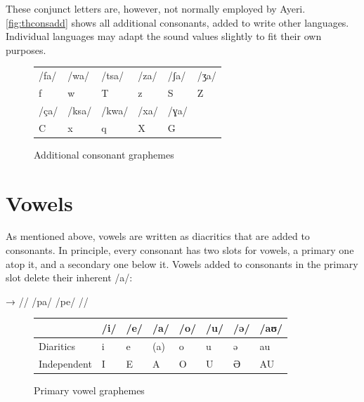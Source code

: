 \noindent These conjunct letters are, however, not normally employed by Ayeri. 
\autoref{fig:thconsadd} shows all additional consonants, added to write other 
languages. Individual languages may adapt the sound values slightly to fit 
their 
own purposes.

\begin{figure}[ht]
\caption{Additional consonant graphemes}

\begin{tabu} to \linewidth{X[c] X[c] X[c] X[c] X[c] X[c]}
\toprule
\tableheaderfont	/fa/ & /wa/ & /tsa/ & /za/ & /ʃa/ & /ʒa/ \\
\rowfont{\Tagati\huge}	f & w & T & z & S & Z \\

\midrule

\tableheaderfont	/ça/ & /ksa/ & /kwa/ & /xa/ & /ɣa/ \\
\rowfont{\Tagati\huge}	C & x & q & X & G \\

\bottomrule
\end{tabu}
\label{fig:thconsadd}
\end{figure}


\section{Vowels}

As mentioned above, vowels are written as diacritics that are added to 
consonants. In principle, every consonant has two slots for vowels, a primary 
one atop it, and a secondary one below it. Vowels added to consonants in 
the primary slot delete their inherent /a/:

\ex[lingstyle=thex]\begingl
	\gla {}	→	 //
	\glb /pa/	{}	/pe/ //
\endgl\xe

\begin{figure}[th]
\caption{Primary vowel graphemes}

\begin{tabu} to \linewidth{H[c] X[c] X[c] X[c] X[c] X[c] X[c] X[c]}
\toprule
\tableheaderfont

	& /i/
	& /e/
	& /a/
	& /o/
	& /u/
	& /ə/
	& /aʊ/
	\\
	
\toprule
	
Diaritics
	& \Tagati\huge *i
	& \Tagati\huge *e
	& \huge ({\Tagati *a})
	& \Tagati\huge *o
	& \Tagati\huge *u
	& \Tagati\huge *ə
	& \Tagati\huge *au
	\\

\midrule

Independent
	& \Tagati\huge I
	& \Tagati\huge E
	& \Tagati\huge A
	& \Tagati\huge O
	& \Tagati\huge U
	& \Tagati\huge Ə
	& \Tagati\huge AU
	\\

\bottomrule
\end{tabu}
\label{fig:thvowstop}
\end{figure}

